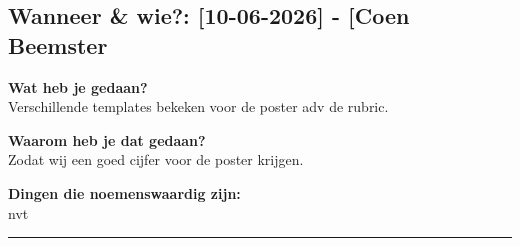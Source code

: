
\subsection*{Wanneer \& wie?: [10-06-2026] - [Coen Beemster}

\textbf{Wat heb je gedaan?}\\
Verschillende templates bekeken voor de poster adv de rubric.
\vspace{0.3cm} 

\noindent \textbf{Waarom heb je dat gedaan?}\\
Zodat wij een goed cijfer voor de poster krijgen.

\noindent \textbf{Dingen die noemenswaardig zijn:}\\
nvt


\vspace{0.5cm}
\hrule 
\vspace{0.5cm}
